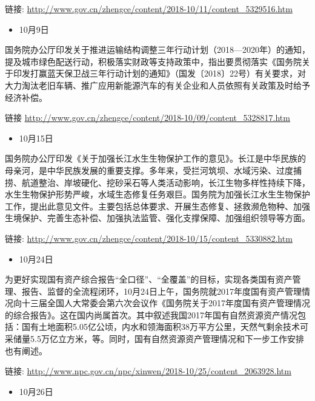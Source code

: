 \documentclass[]{book}
\providecommand{\tightlist}{%
  \setlength{\itemsep}{0pt}\setlength{\parskip}{0pt}}
\begin{document}
链接: \url{http://www.gov.cn/zhengce/content/2018-10/11/content_5329516.htm}

\begin{itemize}
\tightlist
\item
  10月9日
\end{itemize}

国务院办公厅印发关于推进运输结构调整三年行动计划（2018---2020年）的通知，提及城市绿色配送行动，积极落实财政等支持政策中，指出要贯彻落实《国务院关于印发打赢蓝天保卫战三年行动计划的通知》（国发〔2018〕22号）有关要求，对大力淘汰老旧车辆、推广应用新能源汽车的有关企业和人员依照有关政策及时给予经济补偿。

链接 \url{http://www.gov.cn/zhengce/content/2018-10/09/content_5328817.htm}

\begin{itemize}
\tightlist
\item
  10月15日
\end{itemize}

国务院办公厅印发《关于加强长江水生生物保护工作的意见》。长江是中华民族的母亲河，是中华民族发展的重要支撑。多年来，受拦河筑坝、水域污染、过度捕捞、航道整治、岸坡硬化、挖砂采石等人类活动影响，长江生物多样性持续下降，水生生物保护形势严峻，水域生态修复任务艰巨。国务院为加强长江水生生物保护工作，提出此意见文件。主要包括总体要求、开展生态修复、拯救濒危物种、加强生境保护、完善生态补偿、加强执法监管、强化支撑保障、加强组织领导等方面。

链接: \url{http://www.gov.cn/zhengce/content/2018-10/15/content_5330882.htm}

\begin{itemize}
\tightlist
\item
  10月24日
\end{itemize}

为更好实现国有资产综合报告``全口径''、``全覆盖''的目标，实现各类国有资产管理、报告、监督的全流程闭环，10月24日上午，国务院就2017年度国有资产管理情况向十三届全国人大常委会第六次会议作《国务院关于2017年度国有资产管理情况的综合报告》。这在国内尚属首次。其中叙述我国2017年国有自然资源资产情况包括：国有土地面积5.05亿公顷，内水和领海面积38万平方公里，天然气剩余技术可采储量5.5万亿立方米，等。同时，国有自然资源资产管理情况和下一步工作安排也有阐述。

链接: \url{http://www.npc.gov.cn/npc/xinwen/2018-10/25/content_2063928.htm}

\begin{itemize}
\tightlist
\item
  10月26日
\end{itemize}
\end{document}
